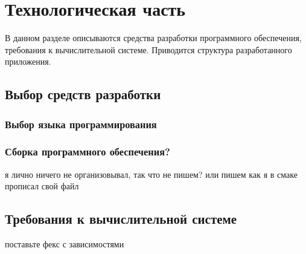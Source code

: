 \section{Технологическая часть}

В данном разделе описываются средства разработки программного обеспечения, требования к вычислительной системе. Приводится структура разработанного приложения.

\subsection{Выбор средств разработки}

\subsubsection{Выбор языка программирования}

\subsubsection{Сборка программного обеспечения?}

я лично ничего не организовывал, так что не пишем? или пишем как я в смаке прописал свой файл

\subsection{Требования к вычислительной системе}

поставьте фекс с зависимостями

\pagebreak